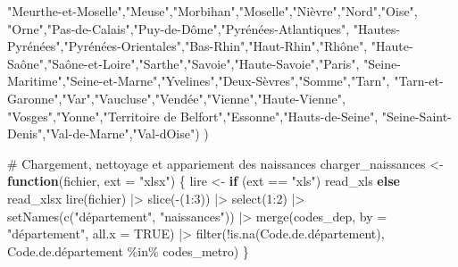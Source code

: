 \documentclass[
  letterpaper,
  DIV=11,
  numbers=noendperiod]{scrartcl}
\newenvironment{Shaded}{\begin{snugshade}}{\end{snugshade}}
\newcommand{\AttributeTok}[1]{\textcolor[rgb]{0.40,0.45,0.13}{#1}}
\newcommand{\CommentTok}[1]{\textcolor[rgb]{0.37,0.37,0.37}{#1}}
\newcommand{\ConstantTok}[1]{\textcolor[rgb]{0.56,0.35,0.01}{#1}}
\newcommand{\ControlFlowTok}[1]{\textcolor[rgb]{0.00,0.23,0.31}{\textbf{#1}}}
\newcommand{\DecValTok}[1]{\textcolor[rgb]{0.68,0.00,0.00}{#1}}
\newcommand{\FunctionTok}[1]{\textcolor[rgb]{0.28,0.35,0.67}{#1}}
\newcommand{\NormalTok}[1]{\textcolor[rgb]{0.00,0.23,0.31}{#1}}
\newcommand{\OtherTok}[1]{\textcolor[rgb]{0.00,0.23,0.31}{#1}}
\newcommand{\SpecialCharTok}[1]{\textcolor[rgb]{0.37,0.37,0.37}{#1}}
\newcommand{\StringTok}[1]{\textcolor[rgb]{0.13,0.47,0.30}{#1}}
\begin{document}
\begin{Shaded}
\begin{Highlighting}[]
    \StringTok{"Meurthe{-}et{-}Moselle"}\NormalTok{,}\StringTok{"Meuse"}\NormalTok{,}\StringTok{"Morbihan"}\NormalTok{,}\StringTok{"Moselle"}\NormalTok{,}\StringTok{"Nièvre"}\NormalTok{,}\StringTok{"Nord"}\NormalTok{,}\StringTok{"Oise"}\NormalTok{,}
    \StringTok{"Orne"}\NormalTok{,}\StringTok{"Pas{-}de{-}Calais"}\NormalTok{,}\StringTok{"Puy{-}de{-}Dôme"}\NormalTok{,}\StringTok{"Pyrénées{-}Atlantiques"}\NormalTok{,}
    \StringTok{"Hautes{-}Pyrénées"}\NormalTok{,}\StringTok{"Pyrénées{-}Orientales"}\NormalTok{,}\StringTok{"Bas{-}Rhin"}\NormalTok{,}\StringTok{"Haut{-}Rhin"}\NormalTok{,}\StringTok{"Rhône"}\NormalTok{,}
    \StringTok{"Haute{-}Saône"}\NormalTok{,}\StringTok{"Saône{-}et{-}Loire"}\NormalTok{,}\StringTok{"Sarthe"}\NormalTok{,}\StringTok{"Savoie"}\NormalTok{,}\StringTok{"Haute{-}Savoie"}\NormalTok{,}\StringTok{"Paris"}\NormalTok{,}
    \StringTok{"Seine{-}Maritime"}\NormalTok{,}\StringTok{"Seine{-}et{-}Marne"}\NormalTok{,}\StringTok{"Yvelines"}\NormalTok{,}\StringTok{"Deux{-}Sèvres"}\NormalTok{,}\StringTok{"Somme"}\NormalTok{,}\StringTok{"Tarn"}\NormalTok{,}
    \StringTok{"Tarn{-}et{-}Garonne"}\NormalTok{,}\StringTok{"Var"}\NormalTok{,}\StringTok{"Vaucluse"}\NormalTok{,}\StringTok{"Vendée"}\NormalTok{,}\StringTok{"Vienne"}\NormalTok{,}\StringTok{"Haute{-}Vienne"}\NormalTok{,}
    \StringTok{"Vosges"}\NormalTok{,}\StringTok{"Yonne"}\NormalTok{,}\StringTok{"Territoire de Belfort"}\NormalTok{,}\StringTok{"Essonne"}\NormalTok{,}\StringTok{"Hauts{-}de{-}Seine"}\NormalTok{,}
    \StringTok{"Seine{-}Saint{-}Denis"}\NormalTok{,}\StringTok{"Val{-}de{-}Marne"}\NormalTok{,}\StringTok{"Val{-}d\textquotesingle{}Oise"}\NormalTok{)}
\NormalTok{)}

\CommentTok{\# Chargement, nettoyage et appariement des naissances}
\NormalTok{charger\_naissances }\OtherTok{\textless{}{-}} \ControlFlowTok{function}\NormalTok{(fichier, }\AttributeTok{ext =} \StringTok{"xlsx"}\NormalTok{) \{}
\NormalTok{  lire }\OtherTok{\textless{}{-}} \ControlFlowTok{if}\NormalTok{ (ext }\SpecialCharTok{==} \StringTok{"xls"}\NormalTok{) read\_xls }\ControlFlowTok{else}\NormalTok{ read\_xlsx}
  \FunctionTok{lire}\NormalTok{(fichier) }\SpecialCharTok{|\textgreater{}}
    \FunctionTok{slice}\NormalTok{(}\SpecialCharTok{{-}}\NormalTok{(}\DecValTok{1}\SpecialCharTok{:}\DecValTok{3}\NormalTok{)) }\SpecialCharTok{|\textgreater{}}
    \FunctionTok{select}\NormalTok{(}\DecValTok{1}\SpecialCharTok{:}\DecValTok{2}\NormalTok{) }\SpecialCharTok{|\textgreater{}}
    \FunctionTok{setNames}\NormalTok{(}\FunctionTok{c}\NormalTok{(}\StringTok{"département"}\NormalTok{, }\StringTok{"naissances"}\NormalTok{)) }\SpecialCharTok{|\textgreater{}}
    \FunctionTok{merge}\NormalTok{(codes\_dep, }\AttributeTok{by =} \StringTok{"département"}\NormalTok{, }\AttributeTok{all.x =} \ConstantTok{TRUE}\NormalTok{) }\SpecialCharTok{|\textgreater{}}
    \FunctionTok{filter}\NormalTok{(}\SpecialCharTok{!}\FunctionTok{is.na}\NormalTok{(Code.de.département),}
\NormalTok{           Code.de.département }\SpecialCharTok{\%in\%}\NormalTok{ codes\_metro)}
\NormalTok{\}}


\end{Highlighting}
\end{Shaded}
\end{document}
